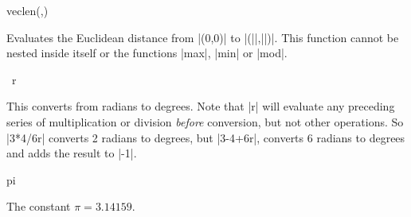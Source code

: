 \begin{math-function}{veclen(,)}

	Evaluates the Euclidean distance from |(0,0)| to |(||,||)|. 
	This function cannot be nested inside itself or the functions |max|,
	|min| or |mod|.

\begin{codeexample}[post=\tt\footnotesize\pgfmathresult]
\end{codeexample}

\begin{codeexample}[post=\tt\footnotesize\pgfmathresult]
\end{codeexample}

\end{math-function}

\begin{math-operator}{\ r}

	This converts  from radians to degrees. Note that |r| will 
	evaluate any preceding series of multiplication or division 
	\emph{before} conversion, but not other operations. So |3*4/6r| 
	converts 2 radians to degrees, but |3-4+6r|, converts 6 radians to
	degrees and adds the result to |-1|.

\begin{codeexample}[post=\tt\footnotesize\pgfmathresult]
\end{codeexample}

\begin{codeexample}[post=\tt\footnotesize\pgfmathresult]
\end{codeexample}

\begin{codeexample}[post=\tt\footnotesize\pgfmathresult]
\end{codeexample}

\end{math-operator}

\begin{math-constant}{pi}

	The constant $\pi=3.14159$.
	
\begin{codeexample}[post=\tt\footnotesize\pgfmathresult]
\end{codeexample}

\begin{codeexample}[post=\tt\footnotesize\pgfmathresult]
\end{codeexample}

\end{math-constant}

